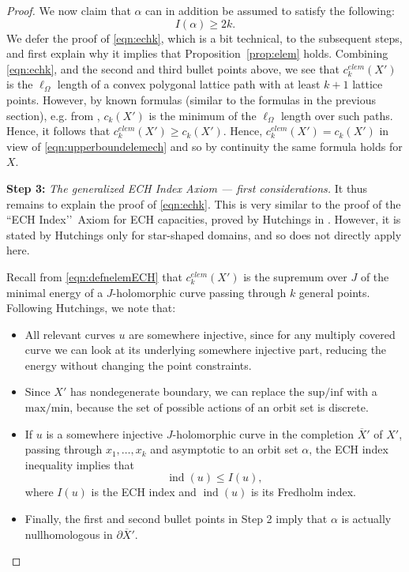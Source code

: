 \documentclass[11pt, reqno]{amsart}
\theoremstyle{remark}
\numberwithin{equation}{subsection}
\numberwithin{figure}{section}
\theoremstyle{customremark}
\newcommand{\NI}{{\noindent}}
\newcommand{\ov}{\overline}
\newcommand{\MS}{{\medskip}}
\newcommand{\op}[1]{{\operatorname{#1}}}
\newcommand{\ind}{\op{ind}}
\begin{document}
\begin{proof}
We now claim that $\alpha$ can in addition be assumed to satisfy the following:
\begin{equation}
\label{eqn:echk}
I(\alpha) \ge 2k.
\end{equation}
We defer the proof of \eqref{eqn:echk}, which is a bit technical, to the subsequent steps, and first explain why it implies that 
Proposition~\ref{prop:elem} holds.
Combining \eqref{eqn:echk}, and the second and third bullet points above, we see that $c^{elem}_k(X')$ is the 
$\ell_{\Omega}$ length of a convex polygonal lattice path with at least $k+1$ lattice points.  However, by known formulas (similar to the formulas in the previous section), e.g. from
\cite{Hutchq},
 $c_k(X')$ is the minimum of the $\ell_{\Omega}$ length over such paths.  Hence, it follows that $c^{elem}_k(X') \ge c_k(X')$.  Hence, $c^{elem}_k(X') = c_k(X')$ in view of 
\eqref{eqn:upperboundelemech} 
and so by continuity the same formula holds for $X$.  
\MS

\NI
{\bf Step 3:} {\it  The generalized ECH Index Axiom --- first considerations.}  It thus remains to explain the proof of \eqref{eqn:echk}.  This is very similar to the proof of the ``ECH Index\rq\rq\, Axiom for ECH capacities, proved by Hutchings in \cite[Thm. 4.1]{Helem}.
 However, it is stated by Hutchings only for star-shaped domains, and so does not directly apply here.  

Recall from \eqref{eqn:defnelemECH}
 that $c^{elem}_k(X')$ is the supremum over $J$ of the minimal energy of a $J$-holomorphic curve passing through $k$ general points.
Following Hutchings, we note that:
\begin{itemize}\item[-] All relevant curves $u$ are somewhere injective, since for any multiply covered curve we can look at its underlying somewhere injective part, reducing the energy without changing the point constraints.
\item[-]  Since $X'$ has  nondegenerate boundary, we can replace the $\text{sup}/ \text{inf}$ with a $\text{max} / \text{min}$, because the set of possible actions of  an orbit set is discrete. 
\item[-]  If $u$ is a somewhere injective $J$-holomorphic curve in the completion $\overline{X}'$ of $X'$, passing through $x_1, \ldots, x_k$ and asymptotic to an orbit set $\alpha$, the ECH index inequality implies that
\begin{equation}
\label{eqn:indexineq}
\ind(u) \le I(u),
\end{equation}
where $I(u)$ is the ECH index and $\ind(u)$ is its Fredholm index.
\item[-] Finally,  the first and second bullet points in Step 2 imply that $\alpha$ is actually nullhomologous in $\partial {\ov X}'$. 
\end{itemize}



\end{proof}
\end{document}
